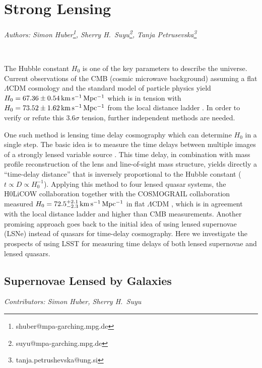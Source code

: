 


\section{Strong Lensing}
\textit{Authors: Simon Huber\footnote{shuber@mpa-garching.mpg.de}, Sherry H.~Suyu\footnote{suyu@mpa-garching.mpg.de}, Tanja Petrusevska\footnote{tanja.petrushevska@ung.si} }

\

The Hubble constant $H_0$ is one of the key parameters to describe the
universe. Current observations of the CMB (cosmic microwave
background) assuming a flat $\Lambda$CDM cosmology and the standard
model of particle physics yield $H_0 = 67.36 \pm 0.54 \, {\rm km\,s^{-1}\,Mpc^{-1}}$
\citep{Planck:2018vks} which is in tension with $H_0 =
73.52 \pm
  1.62 \, {\rm km\,s^{-1}\,Mpc^{-1}}$ from the local distance ladder
\citep{Riess:2016jrr,Riess:2018byc}. In order to verify or refute this
$3.6 \sigma$ tension, further independent methods are needed. 

One such method is lensing time delay cosmography which can determine
$H_0$ in a single step. The basic idea is to measure the time delays
between multiple images of a strongly lensed variable source
\citep{Refsdal:1964}. This time delay, in combination with mass
profile reconstruction of the lens and line-of-sight mass structure,
yields directly a ``time-delay distance'' that is inversely
proportional to the Hubble constant ($t \propto D \propto
H_0^{-1}$). Applying this method to four lensed quasar systems, the
H0LiCOW collaboration \citep{Suyu:2016qxx} together with the
COSMOGRAIL collaboration
\citep[e.g.]{Eigenbrod:2005ie,2013Tewes,2017Courbin} measured $H_0 =
72.5^{+2.1}_{-2.3} \,{\rm km\,s^{-1}\,Mpc^{-1}}$ in flat
$\Lambda$CDM \citep{Birrer:2018vtm}, which is in agreement with the
local distance ladder and higher than CMB measurements.  Another
promising approach goes back to the initial idea of
\cite{Refsdal:1964} using lensed supernovae (LSNe) instead of quasars
for time-delay cosmography. Here we investigate the prospects of using
LSST for measuring time delays of both lensed supernovae and lensed
quasars.

\subsection{Supernovae Lensed by Galaxies}
\textit{Contributors: Simon Huber, Sherry H.~Suyu}


